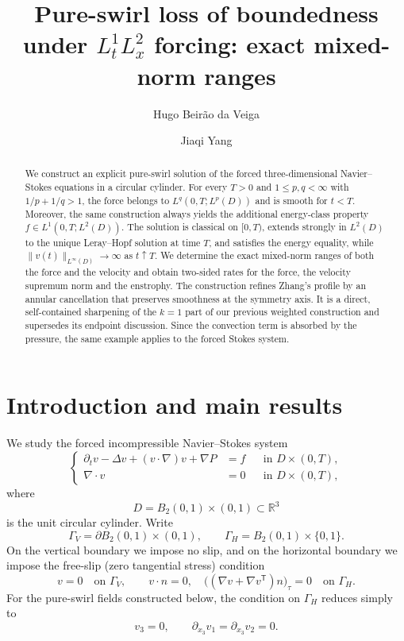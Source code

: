\documentclass[10pt]{amsart}
\title[Pure-swirl loss of boundedness and mixed norms]
{Pure-swirl loss of boundedness under $L^1_tL^2_x$ forcing:
exact mixed-norm ranges}
\author{Hugo Beir\~ao da Veiga}
\author{Jiaqi Yang}
\theoremstyle{definition}
\newcommand{\R}{\mathbb R}
\newcommand{\Gv}{\Gamma_{\!V}}
\newcommand{\Gh}{\Gamma_{\!H}}
\begin{document}
\begin{abstract}
We construct an explicit pure-swirl solution of the forced three-dimensional
Navier--Stokes equations in a circular cylinder.  For every $T>0$ and
$1\le p,q<\infty$ with $1/p+1/q>1$, the force belongs to
$L^q(0,T;L^p(D))$ and is smooth for $t<T$.  Moreover, the same construction
always yields the additional energy-class property
$f\in L^1(0,T;L^2(D))$.  The solution is classical on $[0,T)$, extends
strongly in $L^2(D)$ to the unique
Leray--Hopf solution at time $T$, and satisfies the energy equality, while
$\|v(t)\|_{L^\infty(D)}\to\infty$ as $t\uparrow T$.  We determine the
exact mixed-norm ranges of both the force and the velocity and obtain two-sided
rates for the force, the velocity supremum norm and the enstrophy.  The
construction refines Zhang's profile by an annular cancellation that preserves
smoothness at the symmetry axis.  It is a direct, self-contained sharpening of
the $k=1$ part of our previous weighted construction and supersedes its endpoint
discussion.  Since the convection term is absorbed by the pressure, the same
example applies to the forced Stokes system.
\end{abstract}

\maketitle

\section{Introduction and main results}

We study the forced incompressible Navier--Stokes
system
\begin{equation}
\label{eq:NS}
\left\{
\begin{aligned}
    \partial_t v-\Delta v+(v\cdot\nabla)v+\nabla P&=f
       &&\text{in }D\times(0,T),\\
    \nabla\cdot v&=0
       &&\text{in }D\times(0,T),
\end{aligned}
\right.
\end{equation}
where
\[
    D=B_2(0,1)\times(0,1)\subset\R^3
\]
is the unit circular cylinder. 
Write
\[
    \Gv=\partial B_2(0,1)\times(0,1),
    \qquad
    \Gh=B_2(0,1)\times\{0,1\}.
\]
On the vertical boundary we impose no slip, and on the horizontal boundary we
impose the free-slip (zero tangential stress) condition
\begin{equation}
\label{eq:boundary}
    v=0\quad\text{on }\Gv,
    \qquad
    v\cdot n=0,
    \quad
    \bigl((\nabla v+\nabla v^{\mathsf T})n\bigr)_{\tau}=0
    \quad\text{on }\Gh.
\end{equation}
For the pure-swirl fields constructed below, the condition on $\Gh$ reduces simply
to
\[
    v_3=0,
    \qquad
    \partial_{x_3}v_1=\partial_{x_3}v_2=0.
\]
\end{document}
